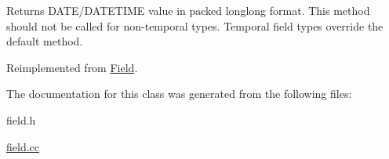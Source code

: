 Returns D\+A\+T\+E/\+D\+A\+T\+E\+T\+I\+ME value in packed longlong format. This method should not be called for non-\/temporal types. Temporal field types override the default method. 

Reimplemented from \mbox{\hyperlink{classField_a85b7713df40509aaa467a75eb3945614}{Field}}.



The documentation for this class was generated from the following files\+:\begin{DoxyCompactItemize}
\item 
field.\+h\item 
\mbox{\hyperlink{field_8cc}{field.\+cc}}\end{DoxyCompactItemize}
